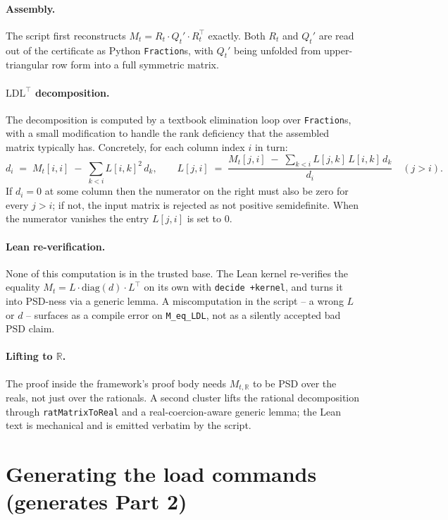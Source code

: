 \documentclass[11pt]{article}
\begin{document}
\paragraph{Assembly.}
The script first reconstructs $M_t = R_t \cdot Q_t' \cdot R_t^\top$
exactly. Both $R_t$ and $Q_t'$ are read out of the certificate as Python
\texttt{Fraction}s, with $Q_t'$ being unfolded from upper-triangular row
form into a full symmetric matrix.

\paragraph{$\mathrm{LDL}^\top$ decomposition.}
The decomposition is computed by a textbook elimination loop over
\texttt{Fraction}s, with a small modification to handle the rank
deficiency that the assembled matrix typically has. Concretely, for each
column index $i$ in turn:
\[
  d_i \;=\; M_t[i,i] \;-\; \sum_{k<i} L[i,k]^2 \, d_k,
  \qquad
  L[j,i] \;=\;
  \frac{M_t[j,i] \;-\; \sum_{k<i} L[j,k]\,L[i,k]\,d_k}{d_i}
  \quad (j>i).
\]
If $d_i = 0$ at some column then the numerator on the right must also be
zero for every $j > i$; if not, the input matrix is rejected as not
positive semidefinite. When the numerator vanishes the entry $L[j,i]$ is
set to $0$.

\paragraph{Lean re-verification.}
None of this computation is in the trusted base. The Lean kernel
re-verifies the equality $M_t = L \cdot \mathrm{diag}(d) \cdot L^\top$
on its own with \texttt{decide +kernel}, and turns it into PSD-ness via
a generic lemma. A miscomputation in the script -- a wrong $L$ or $d$
-- surfaces as a compile error on \texttt{M\_eq\_LDL}, not as a silently
accepted bad PSD claim.

\paragraph{Lifting to $\mathbb{R}$.}
The proof inside the framework's proof body needs $M_{t,\mathbb{R}}$ to
be PSD over the reals, not just over the rationals. A second cluster
lifts the rational decomposition through \texttt{ratMatrixToReal} and a
real-coercion-aware generic lemma; the Lean text is mechanical and is
emitted verbatim by the script.

\section{Generating the load commands (generates Part 2)}
\end{document}
